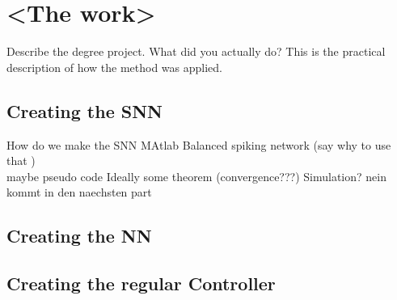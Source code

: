 	\chapter{<The work>}

Describe the degree project. What did you actually do? This is the practical description of how the method was applied.
\section{Creating the SNN}
How do we make the SNN
MAtlab
Balanced spiking network (say why to use that )\\
maybe pseudo code
Ideally some theorem (convergence???)
Simulation? nein kommt in den naechsten part
\section{Creating the NN}

\section{Creating the regular Controller}